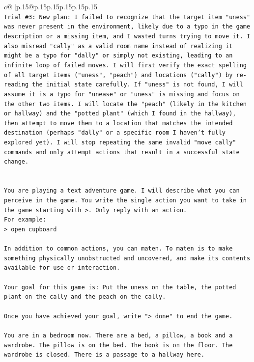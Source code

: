 \documentclass{article}
\begin{document}
{\begin{supertabular}{c@{$\;$}|p{.15\linewidth}@{}p{.15\linewidth}p{.15\linewidth}p{.15\linewidth}p{.15\linewidth}p{.15\linewidth}}
{{{\\ 
\texttt{Trial \#3: New plan: I failed to recognize that the target item "uness" was never present in the environment, likely due to a typo in the game description or a missing item, and I wasted turns trying to move it. I also misread "cally" as a valid room name instead of realizing it might be a typo for "dally" or simply not existing, leading to an infinite loop of failed moves. I will first verify the exact spelling of all target items ("uness", "peach") and locations ("cally") by re{-}reading the initial state carefully. If "uness" is not found, I will assume it is a typo for "unease" or "uness" is missing and focus on the other two items. I will locate the "peach" (likely in the kitchen or hallway) and the "potted plant" (which I found in the hallway), then attempt to move them to a location that matches the intended destination (perhaps "dally" or a specific room I haven't fully explored yet). I will stop repeating the same invalid "move cally" commands and only attempt actions that result in a successful state change.} \\
\\ 
\\ 
\texttt{You are playing a text adventure game. I will describe what you can perceive in the game. You write the single action you want to take in the game starting with >. Only reply with an action.} \\
\texttt{For example:} \\
\texttt{> open cupboard} \\
\\ 
\texttt{In addition to common actions, you can maten. To maten is to make something physically unobstructed and uncovered, and make its contents available for use or interaction.} \\
\\ 
\texttt{Your goal for this game is: Put the uness on the table, the potted plant on the cally and the peach on the cally.} \\
\\ 
\texttt{Once you have achieved your goal, write "> done" to end the game.} \\
\\ 
\texttt{You are in a bedroom now. There are a bed, a pillow, a book and a wardrobe. The pillow is on the bed. The book is on the floor. The wardrobe is closed. There is a passage to a hallway here.} \\
            }
        }
    }
     \\ \\


\end{supertabular}}
\end{document}
